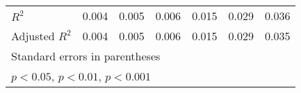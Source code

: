 {\begin{tabular}{l*{6}{c}}
\(R^{2}\)           &       0.004         &       0.005         &       0.006         &       0.015         &       0.029         &       0.036         \\
Adjusted \(R^{2}\)  &       0.004         &       0.005         &       0.006         &       0.015         &       0.029         &       0.035         \\
\bottomrule
\multicolumn{7}{l}{\footnotesize Standard errors in parentheses}\\
\multicolumn{7}{l}{\footnotesize \sym{*} \(p<0.05\), \sym{**} \(p<0.01\), \sym{***} \(p<0.001\)}\\
\end{tabular}
}
